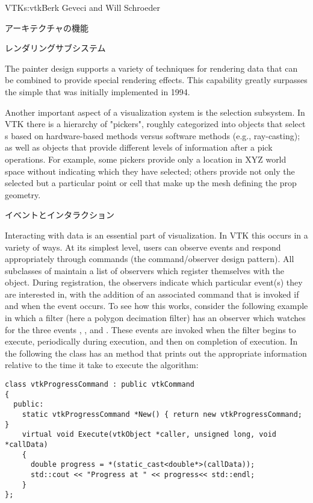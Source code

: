 \begin{aosachapter}{VTK}{s:vtk}{Berk Geveci and Will Schroeder}
\begin{aosasect1}{アーキテクチャの機能}
\begin{aosasect2}{レンダリングサブシステム}

The painter design supports a variety of techniques for rendering data
that can be combined to provide special rendering effects. This
capability greatly surpasses the simple  that
was initially implemented in 1994.

Another important aspect of a visualization system is the selection
subsystem. In VTK there is a hierarchy of "pickers", roughly
categorized into objects that select s based on
hardware-based methods versus software methods (e.g., ray-casting); as
well as objects that provide different levels of information after a
pick operations. For example, some pickers provide only a location in
XYZ world space without indicating which  they have
selected; others provide not only the selected  but a
particular point or cell that make up the mesh defining the prop
geometry.

\end{aosasect2}

\begin{aosasect2}{イベントとインタラクション}

Interacting with data is an essential part of visualization. In VTK
this occurs in a variety of ways. At its simplest level, users can
observe events and respond appropriately through commands (the
command/observer design pattern). All subclasses of 
maintain a list of observers which register themselves with the
object. During registration, the observers indicate which particular
event(s) they are interested in, with the addition of an associated
command that is invoked if and when the event occurs. To see how this
works, consider the following example in which a filter (here a
polygon decimation filter) has an observer which watches for the three
events , , and
. These events are invoked when the filter begins to
execute, periodically during execution, and then on completion of
execution. In the following the  class has an
 method that prints out the appropriate information
relative to the time it take to execute the algorithm:

\begin{verbatim}
class vtkProgressCommand : public vtkCommand
{
  public:
    static vtkProgressCommand *New() { return new vtkProgressCommand; }
    virtual void Execute(vtkObject *caller, unsigned long, void *callData)
    {
      double progress = *(static_cast<double*>(callData));
      std::cout << "Progress at " << progress<< std::endl;
    }
};


\end{verbatim}
\end{aosasect2}
\end{aosasect1}
\end{aosachapter}
